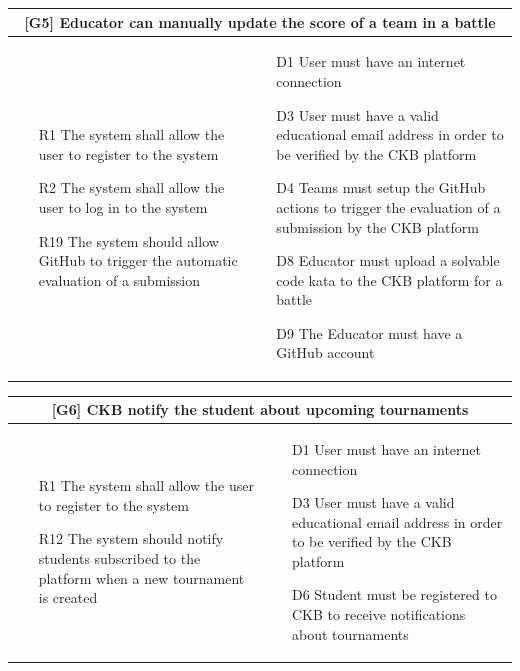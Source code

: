 \begin{tabular}{|p{6cm}|p{6cm}|}
    \hline
    \multicolumn{2}{|c|}{[G5] Educator can manually update the score of a team in a battle} \\
    \hline
    \begin{itemize}
        \item [R1] The system shall allow the user to register to the system
        \item [R2] The system shall allow the user to log in to the system
        \item [R19] The system should allow GitHub to trigger the automatic evaluation of a submission
    \end{itemize}
    &
    \begin{itemize}
        \item [D1] User must have an internet connection
        \item [D3] User must have a valid educational email address in order to be verified by the CKB platform
        \item [D4] Teams must setup the GitHub actions to trigger the evaluation of a submission by the CKB platform
        \item [D8] Educator must upload a solvable code kata to the CKB platform for a battle
        \item [D9] The Educator must have a GitHub account
    \end{itemize}
    \\
    \hline
\end{tabular}

\begin{tabular}{|p{6cm}|p{6cm}|}
    \hline
    \multicolumn{2}{|c|}{[G6] CKB notify the student about upcoming tournaments} \\
    \hline
    \begin{itemize}
        \item [R1] The system shall allow the user to register to the system
        \item [R12] The system should notify students subscribed to the platform when a new tournament is created
    \end{itemize}
    &
    \begin{itemize}
        \item [D1] User must have an internet connection
        \item [D3] User must have a valid educational email address in order to be verified by the CKB platform
        \item [D6] Student must be registered to CKB to receive notifications about tournaments
    \end{itemize}
    \\
    \hline
\end{tabular}

